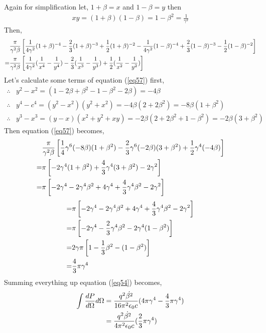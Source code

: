 \documentclass[11pt,a4paper]{article}
\begin{document}
Again for simplification let, $ 1+\beta = x$ and $ 1-\beta = y$ then
\begin{align}
    xy = (1+\beta)(1-\beta) = 1 - \beta^2 = \frac{1}{\gamma^2} 
\end{align}
Then,
\begin{align}
    & \frac{\pi}{\gamma^2 \beta}\left[ \frac{1}{4\gamma^2} (1+\beta)^{-4} -\frac{2}{3}(1+\beta)^{-3} +\frac{1}{2}(1+\beta)^{-2} - \frac{1}{4\gamma^2} (1-\beta)^{-4} +\frac{2}{3}(1-\beta)^{-3} -\frac{1}{2}(1-\beta)^{-2} \right] \notag \\
    =& \frac{\pi}{\gamma^2 \beta}\left[ \frac{1}{4\gamma^2} (\frac{1}{x^4} - \frac{1}{y^4}) - \frac{2}{3} (\frac{1}{x^3} - \frac{1}{y^3}) + \frac{1}{2} (\frac{1}{x^2} - \frac{1}{y^2}) \right] \label{eq57}  
\end{align}
Let's calculate some terms of equation (\ref{eq57}) first,
\begin{align}
    \therefore & y^2-x^2 = (1 -2\beta +\beta^2 -1 -\beta^2 -2\beta) = -4\beta \\
    \therefore & y^4-c^4 = (y^2 - x^2)(y^2 + x^2) = -4\beta(2+2\beta^2) = -8\beta(1 +\beta^2) \\
    \therefore & y^3-x^3 = (y-x)(x^2 +y^2 +xy) = -2\beta (2 +2\beta^2 +1 -\beta^2) = -2\beta(3 +\beta^2)
\end{align}
Then equation (\ref{eq57}) becomes,
\begin{align}
    & \frac{\pi}{\gamma^2 \beta}\left[ \frac{1}{4}\gamma^6 (-8\beta) (1+\beta^2) - \frac{2}{3}\gamma^6 (-2\beta) (3+\beta^2) + \frac{1}{2}\gamma^4 (-4\beta) \right] \notag \\
    =& \pi \left[ -2\gamma^4 (1+\beta^2) + \frac{4}{3}\gamma^4 (3+\beta^2) -2\gamma^2 \right] \notag \\
    =& \pi \left[ -2\gamma^4 -2\gamma^4\beta^2 + 4\gamma^4+\frac{4}{3}\gamma^4 \beta^2 -2\gamma^2 \right] \notag
\end{align}
\begin{align}
    =& \pi \left[ -2\gamma^4 -2\gamma^4\beta^2 + 4\gamma^4+\frac{4}{3}\gamma^4 \beta^2 -2\gamma^2 \right] \notag \\
    =& \pi \left[ -2\gamma^4 -\frac{2}{3}\gamma^4\beta^2 -2\gamma^4(1-\beta^2) \right] \notag \\
    =& 2\gamma\pi \left[ 1-\frac{1}{3}\beta^2 -(1-\beta^2) \right] \notag \\
    =& \frac{4}{3}\pi\gamma^4
\end{align}
Summing everything up equation (\ref{eq54}) becomes,
\begin{align}
    \int \frac{dP}{d\Omega} d\Omega &= \frac{q^2\dot{\beta^2}}{16\pi^2 \epsilon_0c} (4\pi\gamma^4 - \frac{4}{3}\pi\gamma^4) \notag \\
                                    &= \frac{q^2\dot{\beta^2}}{4\pi^2 \epsilon_0c}(\frac{2}{3}\pi \gamma^4) \notag
\end{align}
\end{document}
